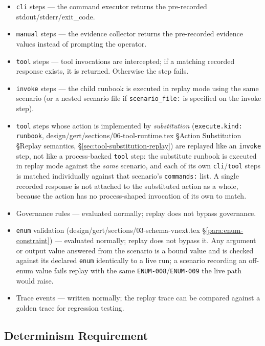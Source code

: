 \begin{itemize}
  \item \texttt{cli} steps — the command executor returns the pre-recorded stdout/stderr/exit\_code.
  \item \texttt{manual} steps — the evidence collector returns the pre-recorded evidence values instead of prompting the operator.
  \item \texttt{tool} steps — tool invocations are intercepted; if a matching recorded response exists, it is returned. Otherwise the step fails.
  \item \texttt{invoke} steps — the child runbook is executed in replay mode using the same scenario (or a nested scenario file if \texttt{scenario\_file:} is specified on the invoke step).
  \item \texttt{tool} steps whose action is implemented by \emph{substitution} (\texttt{execute.kind: runbook}, design/gert/sections/06-tool-runtime.tex \S Action Substitution \S Replay semantics, \S\ref{sec:tool-substitution-replay}) are replayed like an \texttt{invoke} step, not like a process-backed \texttt{tool} step: the substitute runbook is executed in replay mode against the \emph{same} scenario, and each of its own \texttt{cli}/\texttt{tool} steps is matched individually against that scenario's \texttt{commands:} list. A single recorded response is not attached to the substituted action as a whole, because the action has no process-shaped invocation of its own to match.
  \item Governance rules — evaluated normally; replay does not bypass governance.
  \item \texttt{enum} validation (design/gert/sections/03-schema-vnext.tex \S\ref{para:enum-constraint}) — evaluated normally; replay does not bypass it. Any argument or output value answered from the scenario is a bound value and is checked against its declared \texttt{enum} identically to a live run; a scenario recording an off-enum value fails replay with the same \texttt{ENUM-008}/\texttt{ENUM-009} the live path would raise.
  \item Trace events — written normally; the replay trace can be compared against a golden trace for regression testing.
\end{itemize}

\subsection{Determinism Requirement}

